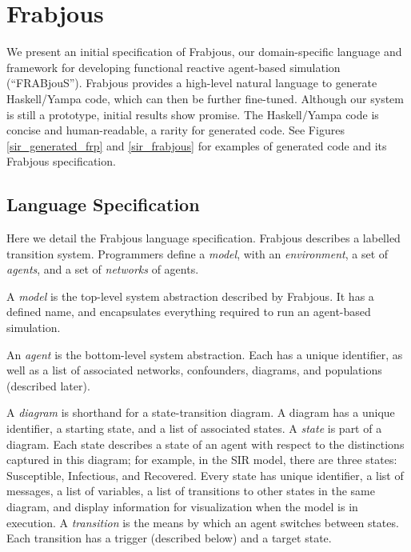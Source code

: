 \documentclass{sig-alternate}
\begin{document}

\section{Frabjous}

We present an initial specification of Frabjous, our domain-specific language and framework for developing functional reactive agent-based simulation (``FRABjouS''). Frabjous provides a high-level natural language to generate Haskell/Yampa code, which can then be further fine-tuned. Although our system is still a prototype, initial results show promise. The Haskell/Yampa code is concise and human-readable, a rarity for generated code. See Figures \ref{sir_generated_frp} and \ref{sir_frabjous} for examples of generated code and its Frabjous specification.

\subsection{Language Specification}

Here we detail the Frabjous language specification. Frabjous describes a labelled transition system. Programmers define a \emph{model}, with an \emph{environment}, a set of \emph{agents}, and a set of \emph{networks} of agents.

A \emph{model} is the top-level system abstraction described by Frabjous. It has a defined name, and encapsulates everything required to run an agent-based simulation.

An \emph{agent} is the bottom-level system abstraction. Each has a unique identifier, as well as a list of associated networks, confounders, diagrams, and populations (described later).

A \emph{diagram} is shorthand for a state-transition diagram. A diagram has a unique identifier, a starting state, and a list of associated states. A \emph{state} is part of a diagram. Each state describes a state of an agent with respect to the distinctions captured in this diagram; for example, in the SIR model, there are three states: Susceptible, Infectious, and Recovered. Every state has unique identifier, a list of messages, a list of variables, a list of transitions to other states in the same diagram, and display information for visualization when the model is in execution. A \emph{transition} is the means by which an agent switches between states. Each transition has a trigger (described below) and a target state.
\end{document}

